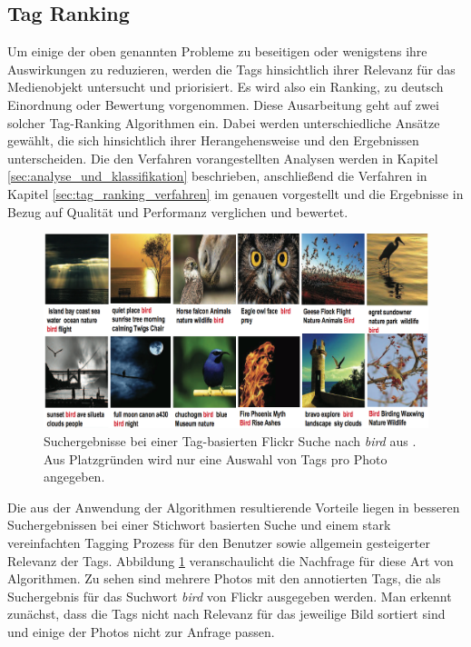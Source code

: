 \subsection{Tag Ranking} %
\label{sub:tag_ranking}

Um einige der oben genannten Probleme zu beseitigen oder wenigstens ihre Auswirkungen zu reduzieren, werden die Tags hinsichtlich ihrer Relevanz für das Medienobjekt untersucht und priorisiert. Es wird also ein Ranking, zu deutsch Einordnung oder Bewertung vorgenommen. Diese Ausarbeitung geht auf zwei solcher Tag-Ranking Algorithmen ein. Dabei werden unterschiedliche Ansätze gewählt, die sich hinsichtlich ihrer Herangehensweise und den Ergebnissen unterscheiden. Die den Verfahren vorangestellten Analysen werden in Kapitel \ref{sec:analyse_und_klassifikation} beschrieben, anschließend die Verfahren in Kapitel \ref{sec:tag_ranking_verfahren} im genauen vorgestellt und die Ergebnisse in Bezug auf Qualität und Performanz verglichen und bewertet.

\begin{figure}[htbp]
  \centering
    \includegraphics[height=0.5\textwidth]{images/bird_search_results_wide.png}
  \caption{Suchergebnisse bei einer Tag-basierten Flickr Suche nach \emph{bird} aus \cite{ranking}. Aus Platzgründen wird nur eine Auswahl von Tags pro Photo angegeben.}
  \label{fig:images_bird_search_results}
\end{figure}

Die aus der Anwendung der Algorithmen resultierende Vorteile liegen in besseren Suchergebnissen bei einer Stichwort basierten Suche und einem stark vereinfachten Tagging Prozess für den Benutzer sowie allgemein gesteigerter Relevanz der Tags. Abbildung \ref{fig:images_bird_search_results} veranschaulicht die Nachfrage für diese Art von Algorithmen. Zu sehen sind mehrere Photos mit den annotierten Tags, die als Suchergebnis für das Suchwort \emph{bird} von Flickr ausgegeben werden. Man erkennt zunächst, dass die Tags nicht nach Relevanz für das jeweilige Bild sortiert sind und einige der Photos nicht zur Anfrage passen.


